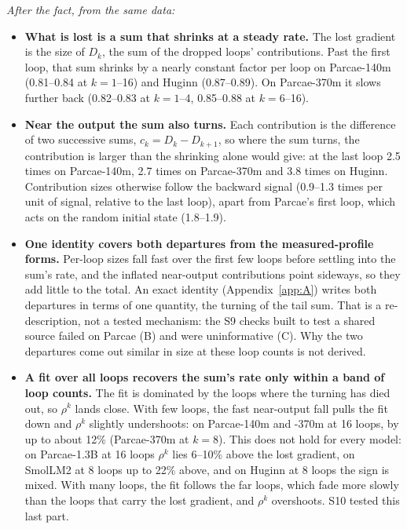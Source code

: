 \documentclass[10pt]{article}
\begin{document}
\emph{After the fact, from the same data:}

\begin{itemize}
\item \textbf{What is lost is a sum that shrinks at a steady rate.} The lost gradient is the size of $D_k$, the sum of the dropped loops' contributions. Past the first loop, that sum shrinks by a nearly constant factor per loop on Parcae-140m (0.81--0.84 at $k = 1$--16) and Huginn (0.87--0.89). On Parcae-370m it slows further back (0.82--0.83 at $k = 1$--4, 0.85--0.88 at $k = 6$--16).
\item \textbf{Near the output the sum also turns.} Each contribution is the difference of two successive sums, $c_k = D_k - D_{k+1}$, so where the sum turns, the contribution is larger than the shrinking alone would give: at the last loop 2.5 times on Parcae-140m, 2.7 times on Parcae-370m and 3.8 times on Huginn. Contribution sizes otherwise follow the backward signal (0.9--1.3 times per unit of signal, relative to the last loop), apart from Parcae's first loop, which acts on the random initial state (1.8--1.9).
\item \textbf{One identity covers both departures from the measured-profile forms.} Per-loop sizes fall fast over the first few loops before settling into the sum's rate, and the inflated near-output contributions point sideways, so they add little to the total. An exact identity (Appendix~\ref{app:A}) writes both departures in terms of one quantity, the turning of the tail sum. That is a re-description, not a tested mechanism: the S9 checks built to test a shared source failed on Parcae (B) and were uninformative (C). Why the two departures come out similar in size at these loop counts is not derived.
\item \textbf{A fit over all loops recovers the sum's rate only within a band of loop counts.} The fit is dominated by the loops where the turning has died out, so $\rho^{k}$ lands close. With few loops, the fast near-output fall pulls the fit down and $\rho^{k}$ slightly undershoots: on Parcae-140m and -370m at 16 loops, by up to about 12\% (Parcae-370m at $k = 8$). This does not hold for every model: on Parcae-1.3B at 16 loops $\rho^{k}$ lies 6--10\% above the lost gradient, on SmolLM2 at 8 loops up to 22\% above, and on Huginn at 8 loops the sign is mixed. With many loops, the fit follows the far loops, which fade more slowly than the loops that carry the lost gradient, and $\rho^{k}$ overshoots. S10 tested this last part.
\end{itemize}
\end{document}
